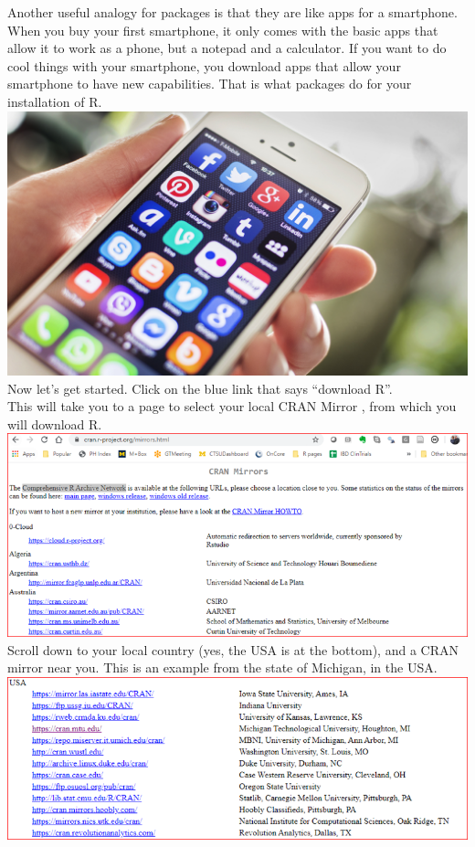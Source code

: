 \documentclass[
]{book}
\begin{document}
Another useful analogy for packages is that they are like apps for a smartphone. When you buy your first smartphone, it only comes with the basic apps that allow it to work as a phone, but a notepad and a calculator.
If you want to do cool things with your smartphone, you download apps that allow your smartphone to have new capabilities. That is what packages do for your installation of R.
\includegraphics{images/smartphone.jpg}\\
Now let's get started. Click on the blue link that says ``download R''.\\
This will take you to a page to select your local CRAN Mirror , from which you will download R.
\includegraphics{images/cran-mirror.png}
Scroll down to your local country (yes, the USA is at the bottom), and a CRAN mirror near you.
This is an example from the state of Michigan, in the USA.
\includegraphics{images/usa-mirrors.png}
\end{document}
